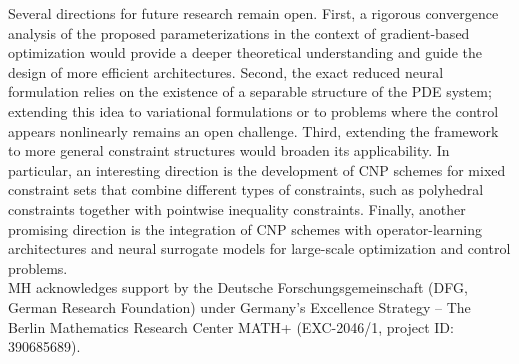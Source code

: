 \documentclass{article}
\numberwithin{equation}{section}
\begin{document}
Several directions for future research remain open. 
First, a rigorous convergence analysis of the proposed parameterizations in the context of gradient-based optimization would provide a deeper theoretical understanding and guide the design of more efficient architectures. Second, the exact reduced neural formulation relies on the existence of a separable structure of the PDE system; extending this idea to variational formulations or to problems where the control appears nonlinearly remains an open challenge. Third, extending the framework to more general constraint structures would broaden its applicability. In particular, an interesting direction is the development of CNP schemes for mixed constraint sets that combine different types of constraints, such as polyhedral constraints together with pointwise inequality constraints. Finally, another promising direction is the integration of CNP schemes with operator-learning architectures and neural surrogate models for large-scale optimization and control problems.\\[1ex]

 MH acknowledges support by the Deutsche Forschungsgemeinschaft (DFG, German Research Foundation) under Germany’s Excellence Strategy – The Berlin Mathematics Research Center
MATH+ (EXC-2046/1, project ID: 390685689).


\end{document}
